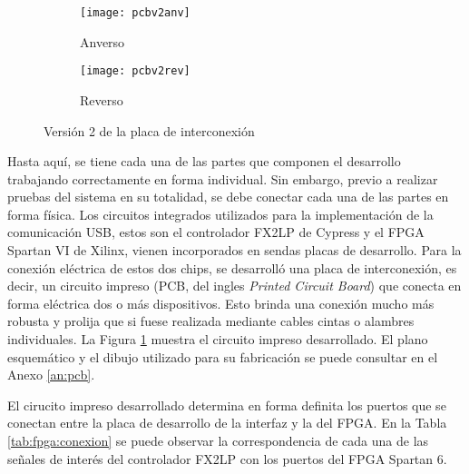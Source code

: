 \begin{figure}[ht]
	\centering
	\begin{subfigure}[t]{0.45\textwidth}
		\centering
		\texttt{[image: pcbv2anv]}
		\caption*{Anverso}
	\end{subfigure}
	\begin{subfigure}[t]{0.45\textwidth}
		\centering
		\texttt{[image: pcbv2rev]}
		\caption*{Reverso}
	\end{subfigure}
	\caption{Versión 2 de la placa de interconexión}
	\label{fpga:pcb:v2}
\end{figure}

Hasta aquí, se tiene cada una de las partes que componen el desarrollo trabajando correctamente en forma individual. Sin embargo, previo a realizar pruebas del sistema en su totalidad, se debe conectar cada una de las partes en forma física. Los circuitos integrados utilizados para la implementación de la comunicación USB, estos son el controlador FX2LP de Cypress y el FPGA Spartan VI de Xilinx, vienen incorporados en sendas placas de desarrollo. Para la conexión eléctrica de estos dos chips, se desarrolló una placa de interconexión, es decir, un circuito impreso (PCB, del ingles {\it Printed Circuit Board}) que conecta en forma eléctrica dos o más dispositivos. Esto brinda una conexión mucho más robusta y prolija que si fuese realizada mediante cables cintas o alambres individuales. La Figura \ref{fpga:pcb:v2} muestra el circuito impreso desarrollado. El plano esquemático y el dibujo utilizado para su fabricación se puede consultar en el Anexo \ref{an:pcb}.

El cirucito impreso desarrollado determina en forma definita los puertos que se conectan entre la placa de desarrollo de la interfaz y la del FPGA. En la Tabla \ref{tab:fpga:conexion} se puede observar la correspondencia de cada una de las señales de interés del controlador FX2LP con los puertos del FPGA Spartan 6.


